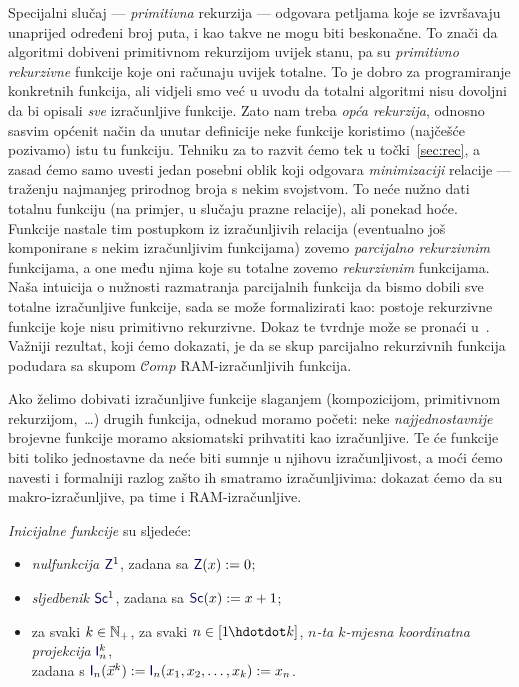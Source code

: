 Specijalni slučaj --- \emph{primitivna} rekurzija --- odgovara petljama koje se izvršavaju unaprijed određeni broj puta, i kao takve ne mogu biti beskonačne. To znači da algoritmi dobiveni primitivnom rekurzijom uvijek stanu, pa su \emph{primitivno rekurzivne} funkcije koje oni računaju uvijek totalne. To je dobro za programiranje konkretnih funkcija, ali vidjeli smo već u uvodu da totalni algoritmi nisu dovoljni da bi opisali \emph{sve} izračunljive funkcije. Zato nam treba \emph{opća rekurzija}, odnosno sasvim općenit način da unutar definicije neke funkcije koristimo (najčešće pozivamo) istu tu funkciju. Tehniku za to razvit ćemo tek u točki~\ref{sec:rec}, a zasad ćemo samo uvesti jedan posebni oblik koji odgovara \emph{minimizaciji} relacije --- traženju najmanjeg prirodnog broja s nekim svojstvom. To neće nužno dati totalnu funkciju (na primjer, u slučaju prazne relacije), ali ponekad hoće. Funkcije nastale tim postupkom iz izračunljivih relacija (eventualno još komponirane s nekim izračunljivim funkcijama) zovemo \emph{parcijalno rekurzivnim} funkcijama, a one među njima koje su totalne zovemo \emph{rekurzivnim} funkcijama. Naša intuicija o nužnosti razmatranja parcijalnih funkcija da bismo dobili sve totalne izračunljive funkcije, sada se može formalizirati kao: postoje rekurzivne funkcije koje nisu primitivno rekurzivne. Dokaz te tvrdnje može se pronaći u~\cite[dodatak]{skr:Vuk}. Važniji rezultat, koji ćemo dokazati, je da se skup parcijalno rekurzivnih funkcija podudara sa skupom $\mathscr Comp$ RAM-izračunljivih funkcija.


Ako želimo dobivati izračunljive funkcije slaganjem (kompozicijom, primitivnom rekurzijom,~\ldots) drugih funkcija, odnekud moramo početi: neke \emph{najjednostavnije} brojevne funkcije moramo aksiomatski prihvatiti kao izračunljive. Te će funkcije biti toliko jednostavne da neće biti sumnje u njihovu izračunljivost, a moći ćemo navesti i formalniji razlog zašto ih smatramo izračunljivima: dokazat ćemo da su makro-izračunljive, pa time i RAM-izračunljive.

\begin{definicija}[{name=[inicijalne funkcije]}]\label{def:init}
\emph{Inicijalne funkcije} su sljedeće:
\begin{itemize}
    \item \emph{nulfunkcija} $\f Z^1$, zadana sa $\f Z(x):=0$;
    \item \emph{sljedbenik} $\f{Sc}^1$, zadana sa $\f{Sc}(x):=x+1$;
    \item za svaki $k\in{\mathbb N}_+$, za svaki $n\in[1\mspace{-1mu}\dd k]$, \emph{$n$-ta $k$-mjesna koordinatna projekcija} $\f I_n^k$,\\ zadana s $\f I_n(\vec x^k):=\f I_n(x_1,x_2,\dotsc,x_k):=x_n$.\qedhere
\end{itemize}
\end{definicija}

